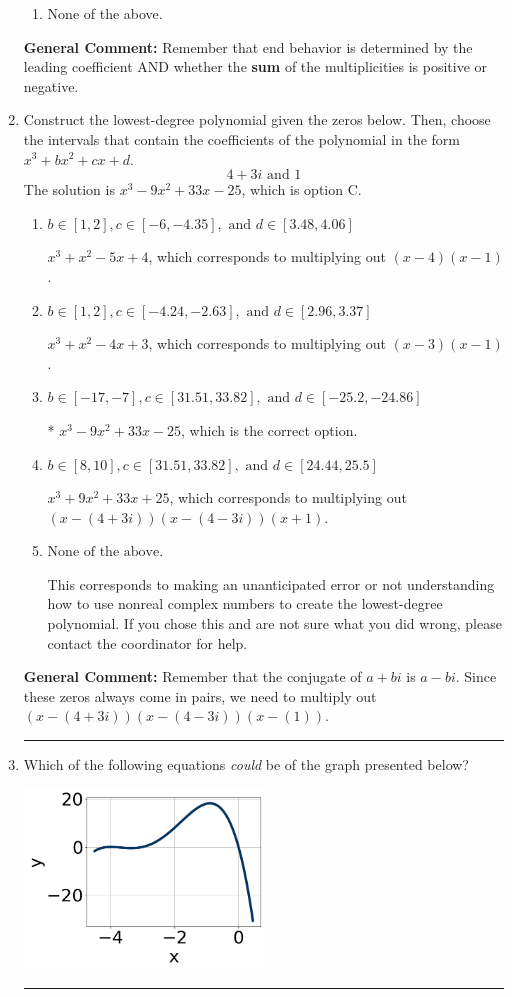 \documentclass{extbook}[14pt]
\newcommand{\litem}[1]{\item #1

\rule{\textwidth}{0.4pt}}
\begin{document}
\begin{enumerate}
{\begin{enumerate}[label=\Alph*.]
\begin{multicols}{2}
\end{multicols}\item None of the above.\end{enumerate}
\textbf{General Comment:} Remember that end behavior is determined by the leading coefficient AND whether the \textbf{sum} of the multiplicities is positive or negative.
}
\litem{
Construct the lowest-degree polynomial given the zeros below. Then, choose the intervals that contain the coefficients of the polynomial in the form $x^3+bx^2+cx+d$.
\[ 4 + 3 i \text{ and } 1 \]The solution is \( x^{3} -9 x^{2} +33 x -25 \), which is option C.\begin{enumerate}[label=\Alph*.]
\item \( b \in [1, 2], c \in [-6, -4.35], \text{ and } d \in [3.48, 4.06] \)

$x^{3} + x^{2} -5 x + 4$, which corresponds to multiplying out $(x -4)(x -1)$.
\item \( b \in [1, 2], c \in [-4.24, -2.63], \text{ and } d \in [2.96, 3.37] \)

$x^{3} + x^{2} -4 x + 3$, which corresponds to multiplying out $(x -3)(x -1)$.
\item \( b \in [-17, -7], c \in [31.51, 33.82], \text{ and } d \in [-25.2, -24.86] \)

* $x^{3} -9 x^{2} +33 x -25$, which is the correct option.
\item \( b \in [8, 10], c \in [31.51, 33.82], \text{ and } d \in [24.44, 25.5] \)

$x^{3} +9 x^{2} +33 x + 25$, which corresponds to multiplying out $(x-(4 + 3 i))(x-(4 - 3 i))(x + 1)$.
\item \( \text{None of the above.} \)

This corresponds to making an unanticipated error or not understanding how to use nonreal complex numbers to create the lowest-degree polynomial. If you chose this and are not sure what you did wrong, please contact the coordinator for help.
\end{enumerate}

\textbf{General Comment:} Remember that the conjugate of $a+bi$ is $a-bi$. Since these zeros always come in pairs, we need to multiply out $(x-(4 + 3 i))(x-(4 - 3 i))(x-(1))$.
}
\litem{
Which of the following equations \textit{could} be of the graph presented below?

\begin{center}
    \includegraphics[width=0.5\textwidth]{../Figures/polyGraphToFunctionCopyA.png}
\end{center}


}
\end{enumerate}
\end{document}
